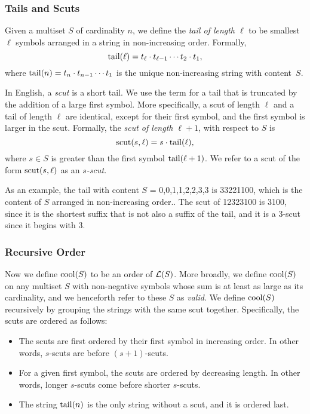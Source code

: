 \subsubsection{Tails and Scuts}
\label{sec:proof_scuts}

Given a multiset $S$ of cardinality $n$, we define the \emph{tail of length $\ell$} to be smallest $\ell$ symbols arranged in a string in non-increasing order.
Formally,
\begin{equation}
    \operatorname{tail}(\ell) = t_{\ell} \cdot t_{\ell-1} \cdots t_2 \cdot t_1,
\end{equation}
where $\operatorname{tail}(n) = t_n \cdot t_{n-1} \cdots t_1$ is the unique non-increasing string with content~$S$.  

In English, a \emph{scut} is a short tail.
We use the term for a tail that is truncated by the addition of a large first symbol.
More specifically, a scut of length $\ell$ and a tail of length $\ell$ are identical, except for their first symbol, and the first symbol is larger in the scut. %
Formally, the \emph{scut of length $\ell+1$}, with respect to $S$ is
\begin{equation}
    \operatorname{scut}(s, \ell) = s \cdot \operatorname{tail}(\ell),
\end{equation}
where $s \in S$ is greater than the first symbol $\operatorname{tail}(\ell+1)$.
We refer to a scut of the form $\operatorname{scut}(s, \ell)$ as an \emph{$s$-scut}.

As an example, the tail with content $S$ = {0,0,1,1,2,2,3,3} is 33221100, which is the content of $S$ arranged in non-increasing order..  The scut of 12323100 is 3100, since it is the shortest suffix that is not also a suffix of the tail, and it is a 3-scut since it begins with 3.

\subsubsection{Recursive Order}
\label{sec:proof_recursive}

Now we define $\operatorname{cool}(S)$ to be an order of $\mathcal{L}(S)$.
More broadly, we define $\operatorname{cool}(S)$ on any multiset $S$ with non-negative symbols whose sum is at least as large as its cardinality, and we henceforth refer to these $S$ as \emph{valid}.
We define $\operatorname{cool}(S)$ recursively by grouping the strings with the same scut together.
Specifically, the scuts are ordered as follows:
\begin{itemize}
    \item The scuts are first ordered by their first symbol in increasing order.
    In other words, $s$-scuts are before $(s+1)$-scuts.
    \item For a given first symbol, the scuts are ordered by decreasing length.
    In other words, longer $s$-scuts come before shorter $s$-scuts.
    \item The string $\operatorname{tail}(n)$ is the only string without a scut, and it is ordered last.
\end{itemize}


